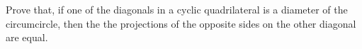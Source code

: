 Prove that, if one of the diagonals in a cyclic quadrilateral is a diameter of the circumcircle, then the the projections of the opposite sides on the other diagonal are equal.
